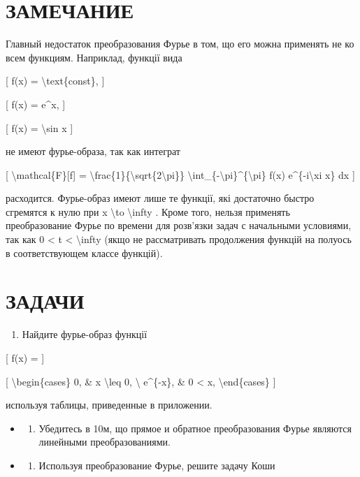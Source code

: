 \documentclass[
]{article}
\providecommand{\tightlist}{%
  \setlength{\itemsep}{0pt}\setlength{\parskip}{0pt}}
\begin{document}
\section{ЗАМЕЧАНИЕ}\label{ux437ux430ux43cux435ux447ux430ux43dux438ux435}

Главный недостаток преобразования Фурье в том, що его можна применять не
ко всем функциям. Наприклад, функції вида

{[} f(x) = \textbackslash text\{const\}, {]}

{[} f(x) = e\^{}x, {]}

{[} f(x) = \textbackslash sin x {]}

не имеют фурье-образа, так как интеграт

{[} \textbackslash mathcal\{F\}{[}f{]} =
\textbackslash frac\{1\}\{\textbackslash sqrt\{2\textbackslash pi\}\}
\textbackslash int\_\{-\textbackslash pi\}\^{}\{\textbackslash pi\} f(x)
e\^{}\{-i\textbackslash xi x\} dx {]}

расходится. Фурье-образ имеют лише те функції, які достаточно быстро
сгремятся к нулю при \textbar x\textbar{} \textbackslash to
\textbackslash infty . Кроме того, нельзя применять преобразование Фурье
по времени для розв'язки задач с начальными условиями, так как 0
\textless{} t \textless{} \textbackslash infty (якщо не рассматривать
продолжения функцій на полуось в соответствующем классе функцій).

\section{ЗАДАЧИ}\label{ux437ux430ux434ux430ux447ux438-1}

\begin{enumerate}
\def\labelenumi{\arabic{enumi}.}
\tightlist
\item
  Найдите фурье-образ функції
\end{enumerate}

{[} f(x) = {]}

{[} \textbackslash begin\{cases\} 0, \& x \textbackslash leq 0,
\textbackslash{} e\^{}\{-x\}, \& 0 \textless{} x,
\textbackslash end\{cases\} {]}

используя таблицы, приведенные в приложении.

\begin{itemize}
\tightlist
\item
  \begin{enumerate}
  \def\labelenumi{\arabic{enumi}.}
  \setcounter{enumi}{1}
  \tightlist
  \item
    Убедитесь в 10м, що прямое и обратное преобразования Фурье являются
    линейными преобразованиями.
  \end{enumerate}
\item
  \begin{enumerate}
  \def\labelenumi{\arabic{enumi}.}
  \setcounter{enumi}{2}
  \tightlist
  \item
    Используя преобразование Фурье, решите задачу Коши
  \end{enumerate}
\end{itemize}
\end{document}
